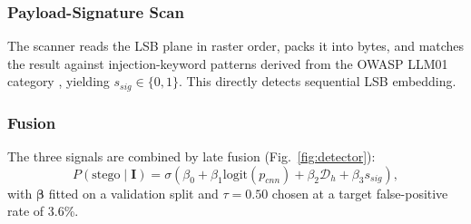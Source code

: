 \documentclass[conference]{IEEEtran}
\begin{document}
\subsubsection{Payload-Signature Scan}
The scanner reads the LSB plane in raster order, packs it into bytes, and matches the result against injection-keyword patterns derived from the OWASP LLM01 category \cite{owasp2023top10}, yielding $s_{sig} \in \{0, 1\}$. This directly detects sequential LSB embedding.

\subsubsection{Fusion}
The three signals are combined by late fusion (Fig.~\ref{fig:detector}):
\begin{equation}
    P(\text{stego} \mid \mathbf{I}) = \sigma\left(\beta_0 + \beta_1 \text{logit}(p_{cnn}) + \beta_2 \mathcal{D}_h + \beta_3 s_{sig}\right),
\end{equation}
with $\boldsymbol{\beta}$ fitted on a validation split and $\tau = 0.50$ chosen at a target false-positive rate of 3.6\%.
\end{document}
